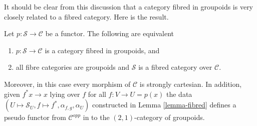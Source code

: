 \medskip\noindent
It should be clear from this discussion that a
category fibred in groupoids is very closely related
to a fibred category. Here is the result.

\begin{lemma}
\label{lemma-fibred-groupoids}
Let $p : \mathcal{S} \to \mathcal{C}$ be a functor.
The following are equivalent
\begin{enumerate}
\item $p : \mathcal{S} \to \mathcal{C}$ is a category
fibred in groupoids, and
\item all fibre categories are groupoids and
$\mathcal{S}$ is a fibred category over $\mathcal{C}$.
\end{enumerate}
Moreover, in this case every morphism of $\mathcal{C}$ is
strongly cartesian. In addition, given $f^\ast x \to x$
lying over $f$ for all $f: V \to U = p(x)$ the data
$(U \mapsto \mathcal{S}_U, f \mapsto f^*, \alpha_{f, g}, \alpha_U)$
constructed in Lemma \ref{lemma-fibred}
defines a pseudo functor from $\mathcal{C}^{opp}$ in to
the $(2, 1)$-category of groupoids.
\end{lemma}

